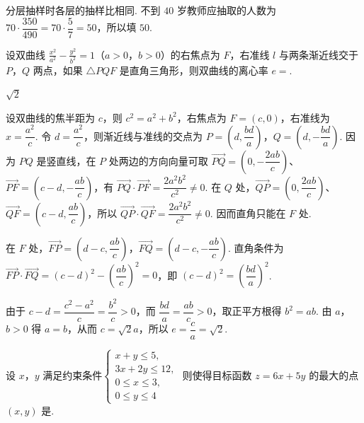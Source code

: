 \begin{solution}
分层抽样时各层的抽样比相同. 不到 \(40\) 岁教师应抽取的人数为 \(70\cdot\dfrac{350}{490}=70\cdot\dfrac57=50\)，所以填 \(50\).
\end{solution}

\begin{problem}
设双曲线 \( \frac{x^{2}}{a^{2}} - \frac{y^{2}}{b^{2}} = 1 \)（\(a > 0\)，\(b > 0\)）的右焦点为 \(F\)，右准线 \(l\) 与两条渐近线交于 \(P\)，\(Q\) 两点，如果 \( \triangle PQF \) 是直角三角形，则双曲线的离心率 \( e = \)\fillinblank{}.
\end{problem}

\begin{answer}
\(\sqrt2\)
\end{answer}

\begin{solution}
设双曲线的焦半距为 \(c\)，则 \(c^2=a^2+b^2\)，右焦点为 \(F=(c,0)\)，右准线为 \(x=\dfrac{a^2}{c}\). 令 \(d=\dfrac{a^2}{c}\)，则渐近线与准线的交点为 \(P=\left(d,\dfrac{bd}{a}\right)\)，\(Q=\left(d,-\dfrac{bd}{a}\right)\). 因为 \(PQ\) 是竖直线，在 \(P\) 处两边的方向向量可取 \(\overrightarrow{PQ}=\left(0,-\dfrac{2ab}{c}\right)\)、\(\overrightarrow{PF}=\left(c-d,-\dfrac{ab}{c}\right)\)，有 \(\overrightarrow{PQ}\cdot\overrightarrow{PF}=\dfrac{2a^2b^2}{c^2}\ne0\). 在 \(Q\) 处，\(\overrightarrow{QP}=\left(0,\dfrac{2ab}{c}\right)\)、\(\overrightarrow{QF}=\left(c-d,\dfrac{ab}{c}\right)\)，所以 \(\overrightarrow{QP}\cdot\overrightarrow{QF}=\dfrac{2a^2b^2}{c^2}\ne0\). 因而直角只能在 \(F\) 处.

在 \(F\) 处，\(\overrightarrow{FP}=\left(d-c,\dfrac{ab}{c}\right)\)，\(\overrightarrow{FQ}=\left(d-c,-\dfrac{ab}{c}\right)\). 直角条件为
\(\overrightarrow{FP}\cdot\overrightarrow{FQ}=\left(c-d\right)^2-\left(\dfrac{ab}{c}\right)^2=0\)，即
\(\left(c-d\right)^2=\left(\dfrac{bd}{a}\right)^2\).

由于 \(c-d=\dfrac{c^2-a^2}{c}=\dfrac{b^2}{c}>0\)，而 \(\dfrac{bd}{a}=\dfrac{ab}{c}>0\)，取正平方根得 \(b^2=ab\). 由 \(a\)，\(b>0\) 得 \(a=b\)，从而 \(c=\sqrt2a\)，所以 \(e=\dfrac ca=\sqrt2\).
\end{solution}

\begin{problem}
设 \(x\)，\(y\) 满足约束条件\(\begin{cases}
x + y \leqslant 5,\\
3x + 2y \leqslant 12,\\
0 \leqslant x \leqslant 3,\\
0 \leqslant y \leqslant 4
\end{cases}\) 则使得目标函数 \(z = 6x + 5y\) 的最大的点 \((x,y)\) 是\fillinblank{}.
\end{problem}

